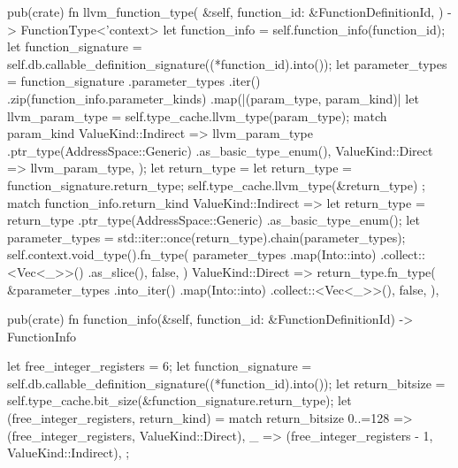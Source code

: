 \documentclass[
  oneside,
  english,
  coorientadorbanca,
  noabntexcite
]{ufsc-thesis-rn46-2019}
\begin{document}
\begin{rustcode}
{    pub(crate) fn llvm_function_type(
        &self,
        function_id: &FunctionDefinitionId,
    ) -> FunctionType<'context> {
        let function_info = self.function_info(function_id);
        let function_signature = self.db.callable_definition_signature((*function_id).into());
        let parameter_types = function_signature
            .parameter_types
            .iter()
            .zip(function_info.parameter_kinds)
            .map(|(param_type, param_kind)| {
                let llvm_param_type = self.type_cache.llvm_type(param_type);
                match param_kind {
                    ValueKind::Indirect => llvm_param_type
                        .ptr_type(AddressSpace::Generic)
                        .as_basic_type_enum(),
                    ValueKind::Direct => llvm_param_type,
                }
            });
        let return_type = {
            let return_type = function_signature.return_type;
            self.type_cache.llvm_type(&return_type)
        };
        match function_info.return_kind {
            ValueKind::Indirect => {
                let return_type = return_type
                    .ptr_type(AddressSpace::Generic)
                    .as_basic_type_enum();
                let parameter_types = std::iter::once(return_type).chain(parameter_types);
                self.context.void_type().fn_type(
                    parameter_types
                        .map(Into::into)
                        .collect::<Vec<_>>()
                        .as_slice(),
                    false,
                )
            }
            ValueKind::Direct => return_type.fn_type(
                &parameter_types
                    .into_iter()
                    .map(Into::into)
                    .collect::<Vec<_>>(),
                false,
            ),
        }
    }

    pub(crate) fn function_info(&self, function_id: &FunctionDefinitionId) -> FunctionInfo {
        let free_integer_registers = 6;
        let function_signature = self.db.callable_definition_signature((*function_id).into());
        let return_bitsize = self.type_cache.bit_size(&function_signature.return_type);
        let (free_integer_registers, return_kind) = match return_bitsize {
            0..=128 => (free_integer_registers, ValueKind::Direct),
            _ => (free_integer_registers - 1, ValueKind::Indirect),
        };

}}
\end{rustcode}
\end{document}
